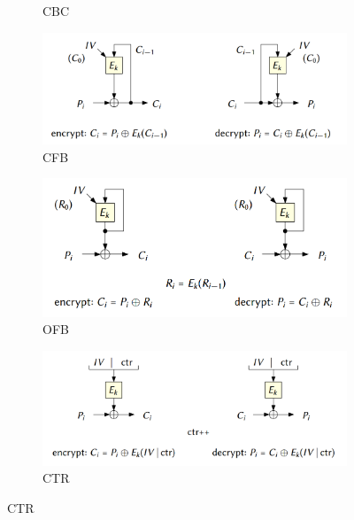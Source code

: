 \documentclass[12pt,a4paper]{article}
\begin{document}
{\begin{itemize}
\begin{itemize}
\begin{figure}[htbp]
\begin{subfigure}[b]{0.4\textwidth}
                    \caption{CBC}
                    \label{fig:sub2}
                \end{subfigure}
                \begin{subfigure}[b]{0.4\textwidth}
                    \centering
                    \includegraphics[width=\textwidth]{cfb.png}
                    \caption{CFB}
                    \label{fig:sub3}
                \end{subfigure}
                
                \vspace{0.5cm}
            
                \begin{subfigure}[b]{0.4\textwidth}
                    \centering
                    \includegraphics[width=\textwidth]{ofb.png}
                    \caption{OFB}
                    \label{fig:sub4}
                \end{subfigure}
                \begin{subfigure}[b]{0.4\textwidth}
                    \centering
                    \includegraphics[width=\textwidth]{ctr.png}
                    \caption{CTR}
                    \label{fig:sub5}
                \end{subfigure}
            

\end{figure}
\end{itemize}
\end{itemize}}
\end{document}
